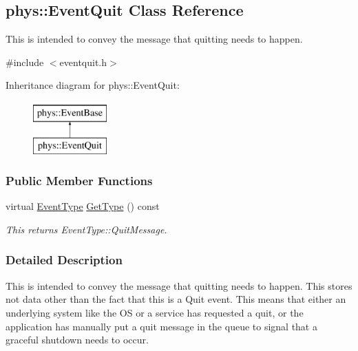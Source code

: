 \hypertarget{classphys_1_1EventQuit}{
\subsection{phys::EventQuit Class Reference}
\label{classphys_1_1EventQuit}
}


This is intended to convey the message that quitting needs to happen.  




{\ttfamily \#include $<$eventquit.h$>$}

Inheritance diagram for phys::EventQuit:\begin{figure}[H]
\begin{center}
\leavevmode
\includegraphics[height=2.000000cm]{classphys_1_1EventQuit}
\end{center}
\end{figure}
\subsubsection*{Public Member Functions}
\begin{DoxyCompactItemize}
\item 
virtual \hyperlink{classphys_1_1EventBase_a5e6a8564e127f654123f0bf6a2751923}{EventType} \hyperlink{classphys_1_1EventQuit_a3bfca875349e73dbda47c3c62a253e3b}{GetType} () const 
\begin{DoxyCompactList}\small\item\em This returns EventType::QuitMessage. \item\end{DoxyCompactList}\end{DoxyCompactItemize}


\subsubsection{Detailed Description}
This is intended to convey the message that quitting needs to happen. This stores not data other than the fact that this is a Quit event. This means that either an underlying system like the OS or a service has requested a quit, or the application has manually put a quit message in the queue to signal that a graceful shutdown needs to occur. 


